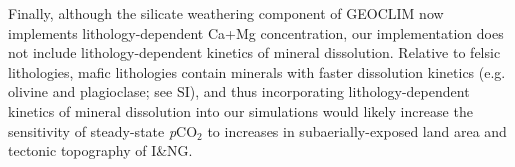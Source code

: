 \documentclass[11pt,letterpaper]{article}
\newcommand{\pCOtwo}{\textit{p}CO$_{2}$\xspace}
\begin{document}
Finally, although the silicate weathering component of GEOCLIM now implements lithology-dependent Ca+Mg concentration, our implementation does not include lithology-dependent kinetics of mineral dissolution. Relative to felsic lithologies, mafic lithologies contain minerals with faster dissolution kinetics (e.g. olivine and plagioclase; see SI), and thus incorporating lithology-dependent kinetics of mineral dissolution into our simulations would likely increase the sensitivity of steady-state \pCOtwo to increases in subaerially-exposed land area and tectonic topography of I\&NG.

\clearpage

\singlespacing

\newpage



\end{document}
